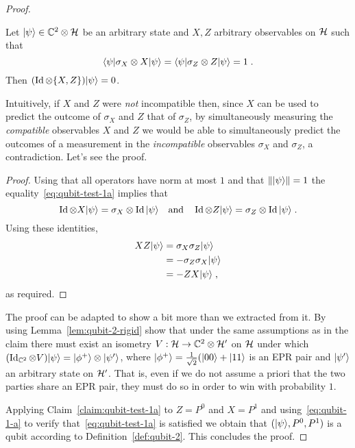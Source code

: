 \begin{proof}
\begin{claim}\label{claim:qubit-test-1a}
Let $|\psi\rangle \in \mathbb{C}^2 \otimes \mathcal{H}$ be an arbitrary state and $X,Z$ arbitrary observables on $\mathcal{H}$ such that 
\begin{equation}\label{eq:qubit-test-1a}
 \langle\psi| \sigma_X \otimes X |\psi\rangle = \langle\psi| \sigma_Z \otimes Z |\psi\rangle = 1\;.
\end{equation}
Then $(\mathop{\rm Id}\nolimits \otimes \{X,Z\})|\psi\rangle = 0$. 
\end{claim}

Intuitively, if $X$ and $Z$ were \emph{not} incompatible then, since $X$ can be used to predict the outcome of $\sigma_X$ and $Z$ that of $\sigma_Z$, by simultaneously measuring the \emph{compatible} observables $X$ and $Z$ we would be able to simultaneously predict the outcomes of a measurement in the \emph{incompatible} observables $\sigma_X$ and $\sigma_Z$, a contradiction. Let's see the proof. 

\begin{proof}
Using that all operators have norm at most $1$ and that $\||\psi\rangle\|=1$ the equality~\eqref{eq:qubit-test-1a} implies that
\[ \mathop{\rm Id}\nolimits\otimes X |{\psi}\rangle = \sigma_X \otimes \mathop{\rm Id}\nolimits |{\psi}\rangle\quad\text{and}
\quad \mathop{\rm Id}\nolimits\otimes Z |{\psi}\rangle = \sigma_Z \otimes \mathop{\rm Id}\nolimits |{\psi}\rangle\;.\]
Using these identities, 
\begin{align*}
XZ|{\psi}\rangle &= \sigma_X \sigma_Z |{\psi}\rangle\\
&= -\sigma_Z \sigma_X |{\psi}\rangle\\
&= - ZX |{\psi}\rangle \;,
\end{align*}
as required. 
\end{proof}

\begin{exercise}
The proof can be adapted to show a bit more than we extracted from it. By using Lemma~\ref{lem:qubit-2-rigid} show that under the same assumptions as in the claim there must exist an isometry $V:\mathcal{H}\to\mathbb{C}^2 \otimes \mathcal{H}'$ on $\mathcal{H}$ under which $(\mathop{\rm Id}\nolimits_{\mathbb{C}^2} \otimes V)|\psi\rangle = |\phi^+\rangle \otimes |\psi'\rangle$, where $|\phi^+\rangle = \frac{1}{\sqrt{2}}(|00\rangle+|11\rangle$ is an EPR pair and $|\psi'\rangle$ an arbitrary state on $\mathcal{H}'$. That is, even if we do not assume a priori that the two parties share an EPR pair, they must do so in order to win with probability $1$.
\end{exercise}

Applying Claim~\ref{claim:qubit-test-1a} to $Z=P^0$ and $X=P^1$ and using~\eqref{eq:qubit-1-a} to verify that~\eqref{eq:qubit-test-1a} is satisfied we obtain that 
 $(|{\psi}\rangle,P^0,P^1)$ is a qubit according to Definition~\ref{def:qubit-2}. This concludes the proof.
\end{proof}


